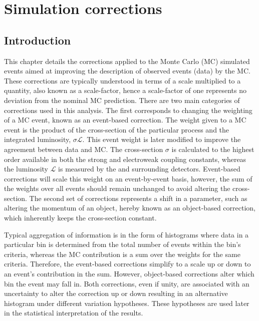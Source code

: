 \chapter{Simulation corrections}
\label{chap:simulation-corrections}


\section{Introduction}

This chapter details the corrections applied to the Monte Carlo (MC) simulated  events aimed at improving the description of observed events (data) by the MC. These corrections are typically understood in terms of a scale multiplied to a quantity, also known as a scale-factor, hence a scale-factor of one represents no deviation from the nominal MC prediction. There are two main categories of corrections used in this analysis. The first corresponds to changing the weighting of a MC event, known as an event-based correction. The weight given to a MC event is the product of the cross-section of the particular process and the integrated luminosity, $\sigma \mathcal{L}$. This event weight is later modified to improve the agreement between data and MC. The cross-section $\sigma$ is calculated to the highest order available in both the strong and electroweak coupling constants, whereas the luminosity $\mathcal{L}$ is measured by the \CMS and surrounding detectors. Event-based corrections will scale this weight on an event-by-event basis, however, the sum of the weights over all events should remain unchanged to avoid altering the cross-section. The second set of corrections represents a shift in a parameter, such as altering the momentum of an object, hereby known as an object-based correction, which inherently keeps the cross-section constant.

Typical aggregation of information is in the form of histograms where data in a particular bin is determined from the total number of events within the bin's criteria, whereas the MC contribution is a sum over the weights for the same criteria. Therefore, the event-based corrections simplify to a scale up or down to an event's contribution in the sum. However, object-based corrections alter which bin the event may fall in. Both corrections, even if unity, are associated with an uncertainty to alter the correction up or down resulting in an alternative histogram under different variation hypotheses. These hypotheses are used later in the statistical interpretation of the results.

